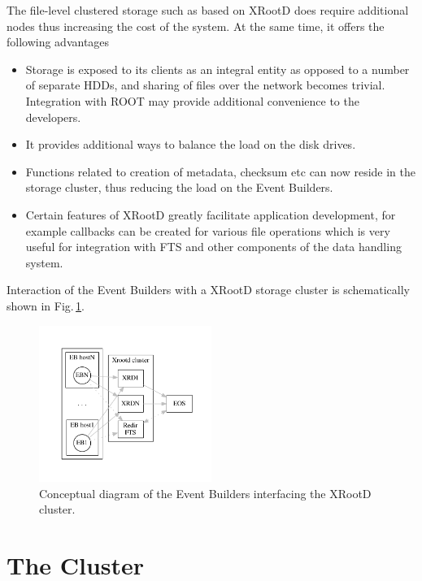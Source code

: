 \documentclass[pdftex,12pt,letter]{article}
\newcommand{\xrd}{XRootD\xspace}
\begin{document}
\noindent The file-level clustered storage such as based on \xrd \cite{xrootd} does require additional nodes thus increasing the cost of the system.
At the same time, it offers the following advantages
\begin{itemize}
\item Storage is exposed to its clients as an integral entity as opposed to a number of separate HDDs, and sharing of files over the network
becomes trivial. Integration with ROOT may provide additional convenience to the developers.

\item It provides additional ways to balance the load on the disk drives.

\item Functions related to creation of metadata, checksum etc can now reside in the storage cluster, thus reducing
the load on the Event Builders.

\item Certain features of \xrd  greatly facilitate application development, for example callbacks can be created for various
file operations which is very useful for integration with FTS and other components of the data handling system.
\end{itemize}

\noindent Interaction of the Event Builders with a \xrd storage cluster is schematically shown in Fig.\,\ref{fig:doob-join}.

\begin{figure}[tbh]
  \centering
  \includegraphics[width=0.5\textwidth]{figures/doob-join.pdf}
  \caption{Conceptual diagram of the Event Builders interfacing the XRootD cluster.}
  \label{fig:doob-join}
\end{figure}

\section{The Cluster}
\end{document}
